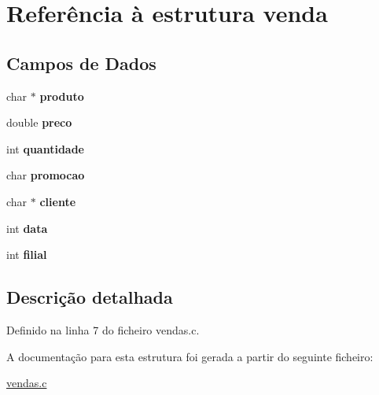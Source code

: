 \hypertarget{structvenda}{}\section{Referência à estrutura venda}
\label{structvenda}
\subsection*{Campos de Dados}
\begin{DoxyCompactItemize}
\item 
\mbox{\label{structvenda_add75e22efb9b20604c65573f1d441e73}} 
char $\ast$ {\bfseries produto}
\item 
\mbox{\label{structvenda_af67f645bd17cc9cf76ad77f54aee57f9}} 
double {\bfseries preco}
\item 
\mbox{\label{structvenda_a2a0d7a3f2121806a8a46cbd35977a428}} 
int {\bfseries quantidade}
\item 
\mbox{\label{structvenda_a7e0ff1d9ead091d7ab34e52f9ca4a1a3}} 
char {\bfseries promocao}
\item 
\mbox{\label{structvenda_aabfaf980412c727ebe7264a5ac4a0b94}} 
char $\ast$ {\bfseries cliente}
\item 
\mbox{\label{structvenda_ad4dc58fae65ac2626e005dd316413e5d}} 
int {\bfseries data}
\item 
\mbox{\label{structvenda_ad70ca7868cde668c9c1fa80fe26af6ba}} 
int {\bfseries filial}
\end{DoxyCompactItemize}


\subsection{Descrição detalhada}


Definido na linha 7 do ficheiro vendas.\+c.



A documentação para esta estrutura foi gerada a partir do seguinte ficheiro\+:\begin{DoxyCompactItemize}
\item 
\hyperlink{vendas_8c}{vendas.\+c}\end{DoxyCompactItemize}
